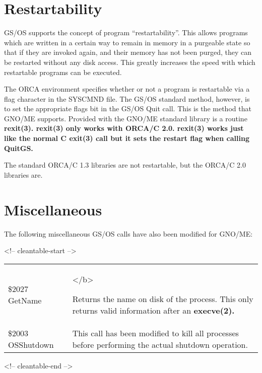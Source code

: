 \documentclass{report}
\begin{document}
\section{Restartability}

GS/OS supports the concept of program
``restartability''. This allows programs which are written in a
certain way to remain in memory in a purgeable state so that if
they are invoked again, and their memory has not been purged,
they can be restarted without any disk access. This greatly
increases the speed with which restartable programs can be
executed.

The ORCA environment specifies whether or
not a program is restartable via a flag character in the SYSCMND
file. The GS/OS standard method, however, is to set the
appropriate flags bit in the GS/OS Quit call. This is the method
that GNO/ME supports. Provided with the GNO/ME standard library
is a routine \bf rexit\rm(3). \bf rexit\rm (3) only works with
ORCA/C 2.0. \bf rexit\rm(3) works just like the normal C \bf exit\rm(3)
call but it sets the restart flag when calling QuitGS.

The standard ORCA/C 1.3 libraries are not
restartable, but the ORCA/C 2.0 libraries are.

\section{Miscellaneous}

The following miscellaneous GS/OS calls have also been modified for GNO/ME:

\begin{rawhtml}
<!-- cleantable-start -->
\end{rawhtml}
\begin{tabular}{ll}
\$2027 GetName	  &
\begin{minipage}[t]{8cm}
	\begin{rawhtml}
	</b>
	\end{rawhtml}
	Returns the name on disk of the process. This only
	returns valid information after an \bf execve\rm(2).
\end{minipage} \hfill \\

\$2003 OSShutdown & 
\begin{minipage}[t]{8cm}
	This call has been modified to kill all processes before
	performing the actual shutdown operation.
\end{minipage} \hfill \\
\end{tabular}
\begin{rawhtml}
<!-- cleantable-end -->
\end{rawhtml}
\end{document}
